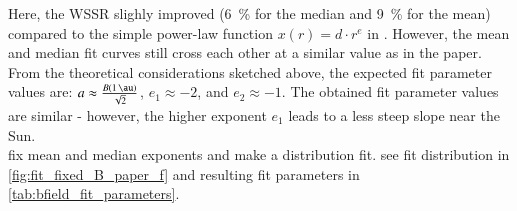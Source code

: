 %

Here, the WSSR slighly improved (\SI{6}{\%} for the median and \SI{9}{\%} for the mean) compared to the simple power-law function $x(r) = d \cdot r^e$ in \citet{Venzmer2017}. However, the mean and median fit curves still cross each other at a similar value as in the paper.\\

From the theoretical considerations sketched above, the expected fit parameter values are: $a \approx \frac{B(\SI{1}{\au})}{\sqrt{2}}$, $e_1 \approx -2$, and $e_2 \approx -1$. The obtained fit parameter values are similar - however, the higher exponent $e_1$ leads to a less steep slope near the Sun.\\

fix mean and median exponents and make a distribution fit. see fit distribution in \autoref{fig:fit_fixed_B_paper_f} and resulting fit parameters in \autoref{tab:bfield_fit_parameters}.\\
\begin{figure}[htb]
\end{figure}

